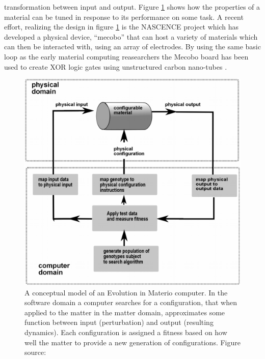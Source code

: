 transformation between input and output.
Figure \ref{figEiM} shows how the properties of a material can be tuned in
response to its performance on some task.
A recent effort, realizing the design in figure \ref{figEiM} is the NASCENCE project
which has developed a physical device, ``mecobo'' that can host a variety of
materials which can then be interacted with, using an array of electrodes.
%
By using the same basic loop as the early material computing reasearchers the
Mecobo board has been used to create XOR logic gates using unstructured carbon
nano-tubes \cite{MECOBO}.
%
\begin{figure}[h]
  \centering
  \includegraphics[width=1\textwidth]{fig/GunnarEiM.png}
  \caption{
    A conceptual model of an Evolution in Materio computer.
    In the software domain a computer searches for a configuration, that when
    applied to the matter in the matter domain, approximates some function
    between input (perturbation) and output (resulting dynamics).
    Each configuration is assigned a fitness based on how well the matter
    to provide a new generation of configurations.
    Figure source: \cite{MILLER_EI2014}
  }
  \label{figEiM}
\end{figure}
